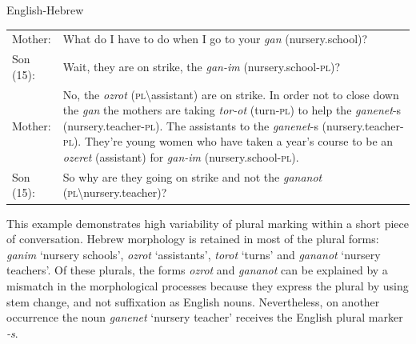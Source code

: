 \ea
\label{ex:6:13}
English-Hebrew \citep[70]{olshtain-blum}\\
\begin{tabularx}{\linewidth}{@{}lQ@{}} 
	Mother: & What do I have to do when I go to your \textit{gan} (nursery.school)?\\
	Son (15): & Wait, they are on strike, the \textit{gan-im} (nursery.school\textsc{-pl})? \\
	Mother: & No, the \textit{ozrot} (\textsc{pl}\textbackslash assistant) are on strike. In order not to close down the \textit{gan} the mothers are taking \textit{tor-ot} (turn-\textsc{pl}) to help the \textit{ganenet}-s (nursery.teacher-\textsc{pl}). The assistants to the  \textit{ganenet}-s (nursery.teacher-\textsc{pl}). They're young women who have taken a year's course to be an \textit{ozeret} (assistant) for \textit{gan-im} (nursery.school-\textsc{pl}).\\ 
    Son (15): & So why are they going on strike and not the \textit{gananot} (\textsc{pl}\textbackslash nursery.teacher)? \\
\end{tabularx}
\z

\noindent This example demonstrates high variability of plural marking within a short piece of conversation. Hebrew morphology is retained in most of the plural forms: \textit{ganim} `nursery schools', \textit{ozrot} `assistants', \textit{torot} `turns' and \textit{gananot} `nursery teachers'. Of these plurals, the forms \textit{ozrot} and \textit{gananot} can be explained by a mismatch in the morphological processes because they express the plural by using stem change, and not suffixation as English nouns. Nevertheless, on another occurrence the noun \textit{ganenet} `nursery teacher' receives the English plural marker \textit{-s}.


